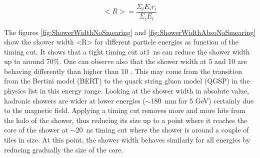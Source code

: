 \begin{equation} \label{eq:showerwidth}
  <R> = \frac{\Sigma_i E_i r_i}{\Sigma_i E_i}
\end{equation}
\vspace{1ex}

The figures \ref{fig:ShowerWidthNoSmearing} and \ref{fig:ShowerWidthAbsoNoSmearing} show the shower width <R> for different particle energies as function of the timing cut. It shows that a tight timing cut at\SI{1}{\nano\second} can reduce the shower width up to around 70\%. One can observe also that the shower width at 5 and 10 \GeV are behaving differently than higher than 10 \GeV. This may come from the transition from the Bertini model (BERT) to the quark string gluon model (QGSP) in the physics list in this energy range. Looking at the shower width in absolute value, hadronic showers are wider at lower energies ($\sim$\SI{180}{\milli\meter} for 5 GeV) certainly due to the magnetic field. Applying a timing cut removes more and more hits from the halo of the shower, thus reducing its size up to a point where it reaches the core of the shower at $\sim$\SI{20}{\nano\second} timing cut where the shower is around a couple of tiles in size. At this point, the shower width behaves similarly for all energies by reducing gradually the size of the core.

